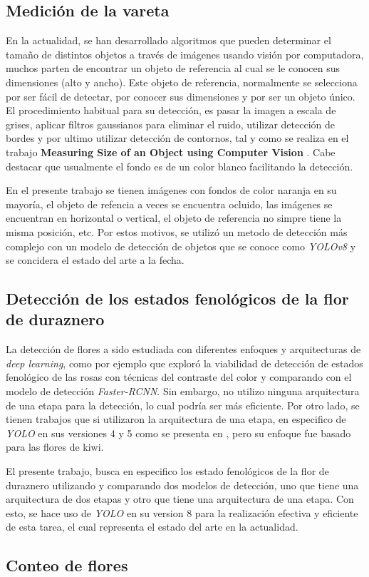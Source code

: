 \subsection{Medición de la vareta}

En la actualidad, se han desarrollado algoritmos que pueden determinar el tamaño de distintos objetos a través de imágenes usando visión por computadora, muchos parten de encontrar un objeto de referencia al cual se le conocen sus dimensiones (alto y ancho). Este objeto de referencia, normalmente se selecciona por ser fácil de detectar, por conocer sus dimensiones y por ser un objeto único. El procedimiento habitual para su detección, es pasar la imagen a escala de grises, aplicar filtros gaussianos para eliminar el ruido, utilizar detección de bordes y por ultimo utilizar detección de contornos, tal y como se realiza en el trabajo \textbf{Measuring Size of an Object using Computer Vision} \cite{ARTICLE:2}. Cabe destacar que usualmente el fondo es de un color blanco facilitando la detección.

En el presente trabajo se tienen imágenes con fondos de color naranja en su mayoría, el objeto de refencia a veces se encuentra ocluido, las imágenes se encuentran en horizontal o vertical, el objeto de referencia no simpre tiene la misma posición, etc. Por estos motivos, se utilizó un metodo de detección más complejo con un modelo de detección de objetos que se conoce como \textit{YOLOv8} y se concidera el estado del arte a la fecha.

\subsection{Detección de los estados fenológicos de la flor de duraznero}
 
La detección de flores a sido estudiada con diferentes enfoques y arquitecturas de \textit{deep learning}, como por ejemplo \cite{ARTICLE:3} que exploró la viabilidad de detección de estados fenológico de las rosas con técnicas del contraste del color y comparando con el modelo de detección \textit{Faster-RCNN}. Sin embargo, no utilizo ninguna arquitectura de una etapa para la detección, lo cual podría ser más eficiente. Por otro lado, se tienen trabajos que si utilizaron la arquitectura de una etapa, en especifico de \textit{YOLO} en sus versiones 4 y 5 como se presenta en \cite{ARTICLE:4} \cite{ARTICLE:5}, pero su enfoque fue basado para las flores de kiwi.

El presente trabajo, busca en especifico los estado fenológicos de la flor de duraznero utilizando y comparando dos modelos de detección, uno que tiene una arquitectura de dos etapas y otro que tiene una arquitectura de una etapa. Con esto, se hace uso de \textit{YOLO} en su version 8 para la realización efectiva y eficiente de esta tarea, el cual representa el estado del arte en la actualidad.

\subsection{Conteo de flores}







